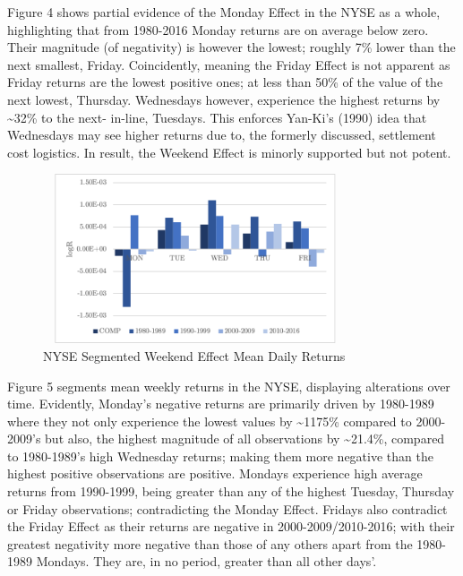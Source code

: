 \documentclass[11pt, english]{article}
\begin{document}
	Figure 4 shows partial evidence of the Monday Effect in the NYSE as a whole, highlighting that from 1980-2016 Monday returns are on average below zero. Their magnitude (of negativity) is however the lowest; roughly 7\% lower than the next smallest, Friday. Coincidently, meaning the Friday Effect is not apparent as Friday returns are the lowest positive ones; at less than 50\% of the value of the next lowest, Thursday. Wednesdays however, experience the highest returns by \~{}32\% to the next- in-line, Tuesdays. This enforces Yan-Ki’s (1990) idea that Wednesdays may see higher returns due to, the formerly discussed, settlement cost logistics. In result, the Weekend Effect is minorly supported but not potent.

	\begin{figure}[H]        
        \begin{center}
                \includegraphics[width=9cm,height=5cm]{NYSE-WE2.png}    
                \caption{NYSE Segmented Weekend Effect Mean Daily Returns} 
        \end{center}
        \end{figure}

	Figure 5 segments mean weekly returns in the NYSE, displaying alterations over time. Evidently, Monday’s negative returns are primarily driven by 1980-1989 where they not only experience the lowest values by \~{}1175\% compared to 2000-2009’s but also, the highest magnitude of all observations by \~{}21.4\%, compared to 1980-1989’s high Wednesday returns; making them more negative than the highest positive observations are positive. Mondays experience high average returns from 1990-1999, being greater than any of the highest Tuesday, Thursday or Friday observations; contradicting the Monday Effect. Fridays also contradict the Friday Effect as their returns are negative in 2000-2009/2010-2016; with their greatest negativity more negative than those of any others apart from the 1980-1989 Mondays. They are, in no period, greater than all other days’.
\end{document}
